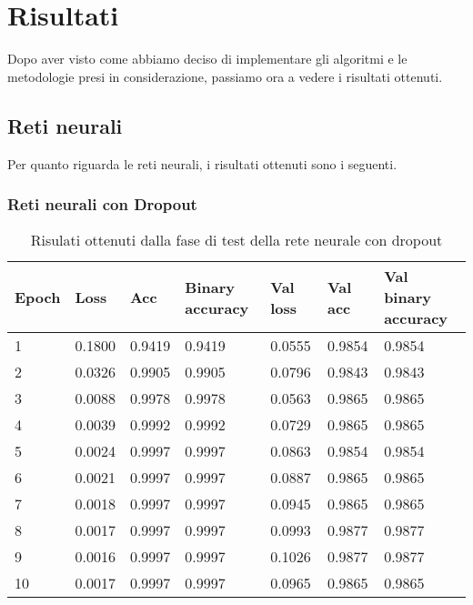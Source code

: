 \section{Risultati}
Dopo aver visto come abbiamo deciso di implementare gli algoritmi e le metodologie presi in considerazione, passiamo ora a vedere i risultati ottenuti.
\subsection{Reti neurali}
Per quanto riguarda le reti neurali, i risultati ottenuti sono i seguenti.
\subsubsection{Reti neurali con Dropout}
\renewcommand{\arraystretch}{1.4}
\begin{table}[H]
	\begin{center}
		\begin{tabular}{|p{1.2cm}|p{1.2cm}|p{1.2cm}|p{2cm}|p{1.2cm}|p{1.2cm}|p{2.5cm}|}
			\hline
				\textbf{Epoch} & \textbf{Loss}    & \textbf{Acc} & \textbf{Binary accuracy} & \textbf{Val loss} & \textbf{Val acc} & \textbf{Val binary accuracy}\\ \hline
				1 & 0.1800 & 0.9419 & 0.9419 & 0.0555 & 0.9854 & 0.9854 \\ \hline
				2 & 0.0326 & 0.9905 & 0.9905 & 0.0796 & 0.9843 & 0.9843 \\ \hline
				3 & 0.0088 & 0.9978 & 0.9978 & 0.0563 & 0.9865 & 0.9865 \\ \hline
				4 & 0.0039 & 0.9992 & 0.9992 & 0.0729 & 0.9865 & 0.9865 \\ \hline
				5 & 0.0024 & 0.9997 & 0.9997 & 0.0863 & 0.9854 & 0.9854 \\ \hline
				6 & 0.0021 & 0.9997 & 0.9997 & 0.0887 & 0.9865 & 0.9865 \\ \hline
				7 & 0.0018 & 0.9997 & 0.9997 & 0.0945 & 0.9865 & 0.9865 \\ \hline
				8 & 0.0017 & 0.9997 & 0.9997 & 0.0993 & 0.9877 & 0.9877 \\ \hline
				9 & 0.0016 & 0.9997 & 0.9997 & 0.1026 & 0.9877 & 0.9877 \\ \hline
				10 & 0.0017 & 0.9997 & 0.9997 & 0.0965 & 0.9865 & 0.9865 \\ \hline
		\end{tabular}
		\caption{Risulati ottenuti dalla fase di test della rete neurale con dropout\label{}}
	\end{center}
\end{table}

